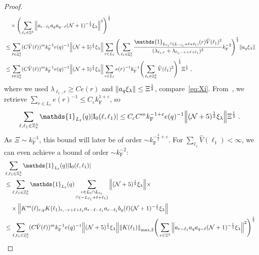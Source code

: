 \documentclass[12pt,a4paper]{article}
\numberwithin{equation}{section}
\newcommand{\1}{\mathbb{I}}
\newcommand{\F}{\mathrm{F}}
\newcommand{\I}{\mathrm{I}}
\newcommand{\Z}{\mathbb{Z}}
\newcommand{\NN}{\mathcal{N}}
\newcommand{\half}{\frac{1}{2}}
\theoremstyle{plain}
\theoremstyle{definition}
\theoremstyle{remark}
\theoremstyle{plain}
\theoremstyle{definition}
\theoremstyle{remark}
\begin{document}
\begin{proof}
\begin{align}
	 &\quad \times \Bigg( \sum\limits_{\ell_1 \in \Z^3} \norm{ a_{r-\ell_1} a_q a_{q-\ell} (\NN+1)^{-\half} \xi_\lambda }^2 \Bigg)^\half \nonumber\\
	 &\leq \sum_{\ell \in \Z^3_*} (C \hat{V}(\ell))^m k_{\F}^{-1} e(q)^{-1}
	 	\norm{ (\NN+5)^{\half} \xi_\lambda}
	 	\sum_{r \in L_\ell} \Bigg( \sum_{\ell_1 \in \Z^3_*} \frac{\mathds{1}_{L_{\ell_1} \cap (L_{-\ell_1}+\ell+\ell_1)}(r) \hat{V}(\ell_1)^2}{(\lambda_{\ell_1,r} + \lambda_{\ell_1,-r+\ell+\ell_1})^2} k_{\F}^{-2} \Bigg)^{\half} \norm{ a_q \xi_\lambda } \nonumber\\
	 &\leq \sum_{\ell \in \Z^3_*} (C \hat{V}(\ell))^m k_{\F}^{-1} e(q)^{-1}
	 	\norm{ (\NN+5)^{\half} \xi_\lambda}
	 	\sum_{r \in L_\ell} e(r)^{-1} k_{\F}^{-1} \Bigg( \sum_{\ell_1 \in \Z^3_*} \hat{V}(\ell_1)^2 \Bigg)^{\half} \Xi^\half \;,
\end{align}
where we used $ \lambda_{\ell_1,r} \ge C e(r) $ and $ \norm{ a_q \xi_\lambda} \le \Xi^\half $, compare~\eqref{eq:Xi}. From~\cite[Lemma~3.2]{CHN24}, we retrieve $ \sum_{r \in L_\ell} e(r)^{-1} \le C_\varepsilon k_{\F}^{1+\varepsilon} $, so
\begin{align}
	\sum_{\ell,\ell_1 \in \Z^3_*} \mathds{1}_{L_\ell}(q) |\I_0(\ell, \ell_1)|
	\leq C_\varepsilon C^m k_{\F}^{-1+\varepsilon} e(q)^{-1}
	 	\norm{ (\NN+5)^{\half} \xi_\lambda}
	 	\Xi^{\half}	\;.
\label{eq:estEQ1121_Coulomb}
\end{align}
As $ \Xi \sim k_{\F}^{-1} $, this bound will later be of order $ \sim k_{\F}^{-\frac 32 + \varepsilon} $. For $ \sum_{\ell_1} \hat{V}(\ell_1) < \infty $, we can even achieve a bound of order $ \sim k_{\F}^{-2} $:
\begin{align}
	&\sum_{\ell,\ell_1 \in \Z^3_*} \mathds{1}_{L_\ell}(q) |\I_0(\ell, \ell_1)| \nonumber\\
	&\leq \sum_{\ell,\ell_1 \in \Z^3_*} \mathds{1}_{L_\ell}(q) \sum\limits_{\substack{r\in L_{\ell} \cap L_{\ell_1}\\ \cap (-L_{\ell_1}+\ell+\ell_1)}}
		\norm{ (\NN+5)^{\half} \xi_\lambda} \times \nonumber\\
	&\quad \times \norm{ K^m(\ell )_{r,q} K(\ell_1)_{r,-r+\ell+\ell_1} a_{r-\ell-\ell_1} a_{r-\ell_1} b_{q}(\ell) (\NN+1)^{-\half} \xi_\lambda }\nonumber\\
	 &\leq \sum_{\ell,\ell_1 \in \Z^3_*} (C \hat{V}(\ell))^m k_{\F}^{-1} e(q)^{-1}
	 	\norm{ (\NN+5)^{\half} \xi_\lambda} \norm{K(\ell_1) }_{\max,2}
	 	\Bigg( \sum\limits_{r\in \Z^3} \norm{ a_{r-\ell_1} a_q a_{q-\ell} (\NN+1)^{-\half} \xi_\lambda }^2 \Bigg)^\half \nonumber\\

\end{align}
\end{proof}
\end{document}
